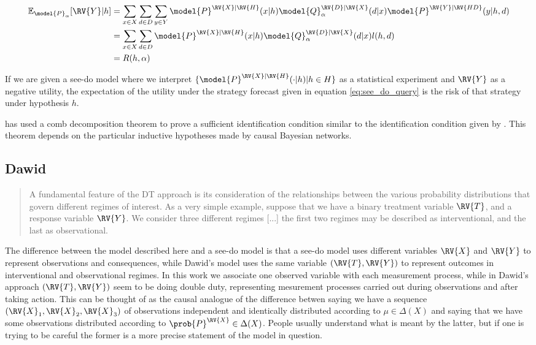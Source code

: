 \begin{align}
    \mathbb{E}_{\model{P}_{\alpha}}[\RV{Y}|h] &= \sum_{x\in X} \sum_{d\in D} \sum_{y\in Y} \model{P}^{\RV{X}|\RV{H}}(x|h) \model{Q}_\alpha^{\RV{D}|\RV{X}}(d|x) \model{P}^{\RV{Y}|\RV{HD}}(y|h,d)\\
    &= \sum_{x\in X} \sum_{d\in D} \model{P}^{\RV{X}|\RV{H}}(x|h) \model{Q}_\alpha^{\RV{D}|\RV{X}}(d|x) l(h,d)\\
    &= R(h,\alpha)
\end{align}

If we are given a see-do model where we interpret $\{\model{P}^{\RV{X}|\RV{H}}(\cdot|h)|h\in H\}$ as a statistical experiment and $\RV{Y}$ as a negative utility, the expectation of the utility under the strategy forecast given in equation \ref{eq:see_do_query} is the risk of that strategy under hypothesis $h$.


\citet{jacobs_causal_2019} has used a comb decomposition theorem to prove a sufficient identification condition similar to the identification condition given by \citet{tian2002general}. This theorem depends on the particular inductive hypotheses made by causal Bayesian networks.

\subsection{Dawid}
\begin{quote}
A fundamental feature of the DT approach is its consideration of the relationships between the various probability distributions that govern different regimes of interest. As a very simple example, suppose that we have a binary treatment variable $\RV{T}$, and a response variable $\RV{Y}$. We consider three different regimes [...] the first two regimes may be described as interventional, and the last as observational.
\end{quote}

The difference between the model described here and a see-do model is that a see-do model uses different variables $\RV{X}$ and $\RV{Y}$ to represent observations and consequences, while Dawid's model uses the same variable $(\RV{T},\RV{Y})$ to represent outcomes in interventional and observational regimes. In this work we associate one observed variable with each measurement process, while in Dawid's approach $(\RV{T},\RV{Y})$ seem to be doing double duty, representing mesurement processes carried out during observations and after taking action. This can be thought of as the causal analogue of the difference betwen saying we have a sequence $(\RV{X}_1,\RV{X}_2,\RV{X}_3)$ of observations independent and identically distributed according to $\mu\in \Delta(X)$ and saying that we have some observations distributed according to $\prob{P}^{\RV{X}}\in \Delta(X)$. People usually understand what is meant by the latter, but if one is trying to be careful the former is a more precise statement of the model in question.

